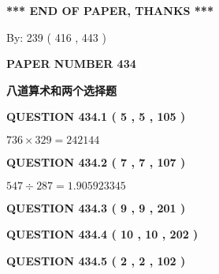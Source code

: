 \documentclass{ctexart}
\begin{document}
\vspace{1.0in} 
{\textbf{\large{ *** END OF PAPER, THANKS *** }}} 
   
   
\hspace{1.0in} By: 
 239 ( 416 ,  443 )
   
   
   
   
\newpage 
\setcounter{page}{ 
   434001 } 
   
   
   
   
 {\textbf{ \Large{ PAPER NUMBER  434  }}}
   
   
\vspace{0.2in}
   
   
   
   
   
   
 \vspace{0.2in}
{\LARGE {\textbf{ 八道算术和两个选择题}}}
   
   
  
\vspace{0.2in}
  
{\textbf{\Large{QUESTION
434.1 
 ( 5 , 5 , 105 )
}}}
  
  
 
 

$ %
736 \times  %
329=   %
242144$
 
 
  
\vspace{0.2in}
  
{\textbf{\Large{QUESTION
434.2 
 ( 7 , 7 , 107 )
}}}
  
  
 
 

$ %
547 \div  %
287=   %
1.905923345$
 
 
  
\vspace{0.2in}
  
{\textbf{\Large{QUESTION
434.3 
 ( 9 , 9 , 201 )
}}}
  
  
  
\vspace{0.2in}
  
{\textbf{\Large{QUESTION
434.4 
 ( 10 , 10 , 202 )
}}}
  
  
  
\vspace{0.2in}
  
{\textbf{\Large{QUESTION
434.5 
 ( 2 , 2 , 102 )
}}}
  
  
 
\end{document}
